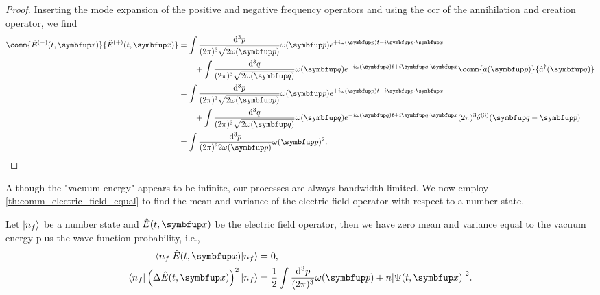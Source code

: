 \begin{proof}
	Inserting the mode expansion of the positive and negative frequency operators and using the \gls{ccr} of the annihilation and creation operator, we find
	\begin{equation}
		\begin{split}
			\comm{\hat{E}^{(-)}(t,\vb{x})}{\hat{E}^{(+)}(t,\vb{x})}
			&=
			\int\frac{\dd[3]{p}}{(2\pi)^3\sqrt{2\omega(\vb{p})}}
			\omega(\vb{p})
			e^{+i\omega(\vb{p})t-i\vb{p}\vdot\vb{x}}
			\\
			&\qquad+
			\int\frac{\dd[3]{q}}{(2\pi)^3\sqrt{2\omega(\vb{q})}}
			\omega(\vb{q})
			e^{-i\omega(\vb{q})t+i\vb{q}\vdot\vb{x}}
			\comm{\hat{a}(\vb{p})}{\hat{a}^\dagger(\vb{q})}
			\\
			&=
			\int\frac{\dd[3]{p}}{(2\pi)^3\sqrt{2\omega(\vb{p})}}
			\omega(\vb{p})
			e^{+i\omega(\vb{p})t-i\vb{p}\vdot\vb{x}}
			\\
			&\qquad+
			\int\frac{\dd[3]{q}}{(2\pi)^3\sqrt{2\omega(\vb{q})}}
			\omega(\vb{q})
			e^{-i\omega(\vb{q})t+i\vb{q}\vdot\vb{x}}
			(2\pi)^3\delta^{(3)}(\vb{q}-\vb{p})
			\\
			&=
			\int\frac{\dd[3]{p}}{(2\pi)^32\omega(\vb{p})}
			\omega(\vb{p})^2
			.
		\end{split}
	\end{equation}
\end{proof}
Although the "vacuum energy" appears to be infinite, our processes are always bandwidth-limited.
We now employ \cref{th:comm_electric_field_equal} to find the mean and variance of the electric field operator with respect to a number state.
\begin{theorem}
	Let $\lvert n_f\rangle$ be a number state and $\hat{E}(t,\vb{x})$ be the electric field operator, then we have zero mean and variance equal to the vacuum energy plus the wave function probability, i.e.,
	\begin{align}
		\bra{n_f}
		\hat{E}(t,\vb{x})
		\ket{n_f}
		&=
		0
		,
		\\
		\bra{n_f}
		\left(
			\Delta
			\hat{E}(t,\vb{x})
		\right)^2
		\ket{n_f}
		&=
		\frac{1}{2}
		\int\frac{\dd[3]{p}}{(2\pi)^3}
		\omega(\vb{p})
		+
		n
		\abs*{\Psi(t,\vb{x})}^2
		.
	\end{align}
\end{theorem}
